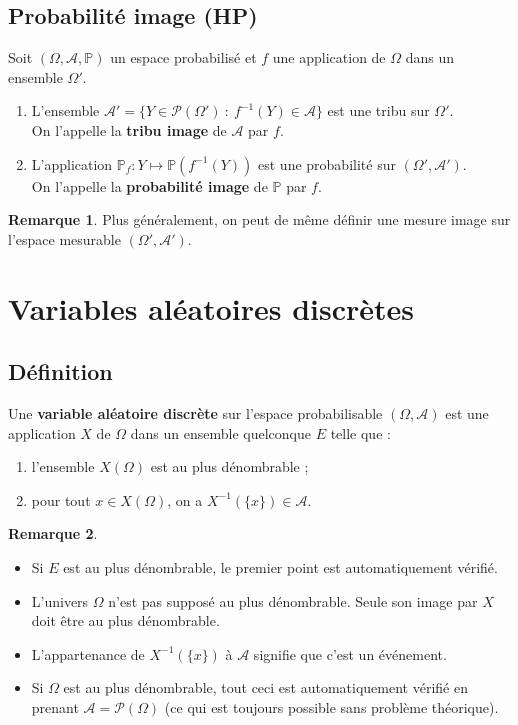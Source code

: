 \documentclass[french]{article}
\renewcommand{\P}{\mathbb{P}}
\newcommand{\inv}{^{-1}}
\theoremstyle{plain}
\theoremstyle{definition}
\newtheorem*{rmq}{Remarque}
\theoremstyle{remark}
\begin{document}
\subsection{Probabilité image (HP)}

\begin{prop}%
	Soit $(\Omega,\mathcal{A},\P)$ un espace probabilisé et $f$ une application de $\Omega$ dans un ensemble $\Omega'$.
	\begin{enumerate}
		\item L'ensemble $\mathcal{A}'=\{Y\in\mathcal{P}(\Omega')\ :\ f\inv(Y)\in\mathcal{A}\}$ est une tribu sur $\Omega'$.\\
		On l'appelle la \textbf{tribu image} de $\mathcal{A}$ par $f$.
		\item L'application $\P_f:Y\mapsto\P(f\inv(Y))$ est une probabilité sur $(\Omega',\mathcal{A}')$.\\
		On l'appelle la \textbf{probabilité image} de $\P$ par $f$.
	\end{enumerate}
\end{prop}

\begin{rmq}
	Plus généralement, on peut de même définir une mesure image sur l'espace mesurable $(\Omega',\mathcal{A}')$.
\end{rmq}

\section{Variables aléatoires discrètes}

\subsection{Définition}

\begin{dfn}
	Une \textbf{variable aléatoire discrète} sur l'espace probabilisable $(\Omega,\mathcal{A})$ est une application $X$ de $\Omega$ dans un ensemble quelconque $E$ telle que :
	\begin{enumerate}
		\item l'ensemble $X(\Omega)$ est au plus dénombrable ;
		\item pour tout $x\in X(\Omega)$, on a $X\inv(\{x\})\in\mathcal{A}$.
	\end{enumerate}
\end{dfn}

\begin{rmq}
	\begin{itemize}
		\item Si $E$ est au plus dénombrable, le premier point est automatiquement vérifié.
		\item L'univers $\Omega$ n'est pas supposé au plus dénombrable. Seule son image par $X$ doit être au plus dénombrable.
		\item L'appartenance de $X\inv(\{x\})$ à $\mathcal{A}$ signifie que c'est un événement.
		\item Si $\Omega$ est au plus dénombrable, tout ceci est automatiquement vérifié en prenant $\mathcal{A}=\mathcal{P}(\Omega)$ (ce qui est toujours possible sans problème théorique).
	\end{itemize}
\end{rmq}
\end{document}
